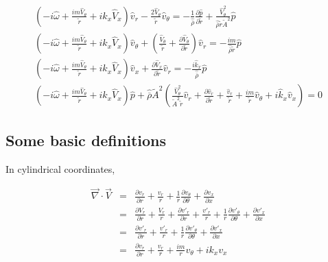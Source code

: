 \begin{small}
\begin{eqnarray}
\left(
-i \widehat{\omega} 
+ \frac{i m \widehat{V}_{\theta}}{\widetilde{r}}
+i \widehat{k}_x \widehat{V}_x 
\right) 
\widehat{v}_r 
-\frac{2 \widehat{V}_{\theta}}{\widetilde{r}} \widehat{v}_{\theta}
 = 
-\frac{1}{\widehat{\overline{\rho}}} \frac{\partial \widehat{p}}{\partial \widetilde{r}}
+\frac{\widehat{V}_{\theta}^2}{\widehat{\overline{\rho}} \widetilde{r} \widetilde{A}^2} 
\widehat{p}
\nonumber
\\
\left(
-i \widehat{\omega} 
+ \frac{i m \widehat{V}_{\theta}}{\widetilde{r}}
+i \widehat{k}_x \widehat{V}_x 
\right) 
\widehat{v}_{\theta} 
+
\left(
\frac{\widehat{V}_{\theta}}{\widetilde{r}}
+\frac{\partial \widehat{V}_{\theta}}{\partial \widetilde{r}}
\right) \widehat{v}_r
 = 
-\frac{i m}{\widehat{\overline{\rho}} \widetilde{r}} \widehat{p}
\nonumber
\\
\left(
-i \widehat{\omega}
+ \frac{i m \widehat{V}_{\theta}}{\widetilde{r}}
+i \widehat{k}_x \widehat{V}_x 
\right) 
\widehat{v}_{x} 
+\frac{\partial \widehat{V}_x}{\partial \widetilde{r}} \widehat{v}_r
 = 
-\frac{i \widehat{k}_x}{\widehat{\overline{\rho}}} \widehat{p}
\nonumber
\\
\left(
-i \widehat{\omega}
+ \frac{i m \widehat{V}_{\theta}}{\widetilde{r}}
+i \widehat{k}_x \widehat{V}_x 
\right) 
\widehat{p} 
+
\widehat{\overline{\rho}} \widetilde{A}^2
\left(
\frac{\widehat{V}_{\theta}^2}{\widetilde{A}^2 \widetilde{r}}
\widehat{v}_r
+ 
\frac{\partial \widehat{v}_r}{\partial \widetilde{r}}
+ 
\frac{\widehat{v}_r}{\widetilde{r}} 
+\frac{i m }{\widetilde{r}} \widehat{v}_{\theta} 
+ i \widehat{k}_x \widehat{v}_x
\right)
 = 
0
\nonumber
\end{eqnarray}
\end{small}%

\subsection{Some basic definitions}

In cylindrical coordinates,

\begin{eqnarray}
\vec{\nabla} \cdot \vec{V}
&=&
\frac{\partial v_r}{\partial r}
+ \frac{v_r}{r}
+ \frac{1}{r}
\frac{\partial v_{\theta}}{\partial \theta}
+\frac{\partial v_x}{\partial x}
\nonumber
\\
&=&
\frac{\partial V_r}{\partial r}
+ \frac{V_r}{r}
+\frac{\partial v'_r}{\partial r}
+ \frac{v'_r}{r}
+ \frac{1}{r}
\frac{\partial v'_{\theta}}{\partial \theta}
+\frac{\partial v'_x}{\partial x}
\nonumber
\\
&=&
\frac{\partial v'_r}{\partial r}
+ \frac{v'_r}{r}
+ \frac{1}{r}
\frac{\partial v'_{\theta}}{\partial \theta}
+\frac{\partial v'_x}{\partial x}
\nonumber
\\
&=&
\frac{\partial v_r}{\partial r}
+ \frac{v_r}{r}
+ \frac{i m}{r} v_{\theta}
+i k_x v_x
\nonumber
\end{eqnarray}

